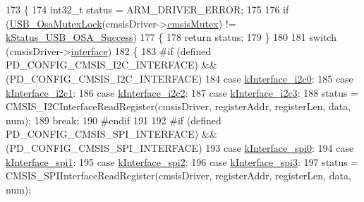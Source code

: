 \begin{DoxyCode}
173 \{
174     int32\_t status = ARM\_DRIVER\_ERROR;
175 
176     \textcolor{keywordflow}{if} (\hyperlink{group__usb__os__abstraction_ga1fed31c4b683c5f652b4e2e8b23c34fd}{USB\_OsaMutexLock}(cmsisDriver->\hyperlink{struct__cmsis__drier__adapter_a952d05d8262ef9aebfa6ca9c4d62fe46}{cmsisMutex}) != 
      \hyperlink{group__usb__os__abstraction_gga453ebd2f93aafb8c938c3a23c815f9bdab90805fb75297fda1ca60dbb2283f933}{kStatus\_USB\_OSA\_Success})
177     \{
178         \textcolor{keywordflow}{return} status;
179     \}
180 
181     \textcolor{keywordflow}{switch} (cmsisDriver->\hyperlink{struct__cmsis__drier__adapter_a51a572fa7a648387cf481b45b862457c}{interface})
182     \{
183 \textcolor{preprocessor}{#if (defined PD\_CONFIG\_CMSIS\_I2C\_INTERFACE) && (PD\_CONFIG\_CMSIS\_I2C\_INTERFACE)
}
184 \textcolor{preprocessor}{}        \textcolor{keywordflow}{case} \hyperlink{group__usb__pd__stack_gga4aed694f998da91dea8d218596d65c1ea0e6fc11f3fbc9732619f2083042e7e17}{kInterface\_i2c0}:
185         \textcolor{keywordflow}{case} \hyperlink{group__usb__pd__stack_gga4aed694f998da91dea8d218596d65c1eaf78fb0f4bdd4db6e8a2e5dab05ba59d2}{kInterface\_i2c1}:
186         \textcolor{keywordflow}{case} \hyperlink{group__usb__pd__stack_gga4aed694f998da91dea8d218596d65c1ea7e08032b6509673dc643a7d01a5baec4}{kInterface\_i2c2}:
187         \textcolor{keywordflow}{case} \hyperlink{group__usb__pd__stack_gga4aed694f998da91dea8d218596d65c1ea369545de00e8d0fb91e9f065d725c16c}{kInterface\_i2c3}:
188             status = CMSIS\_I2CInterfaceReadRegister(cmsisDriver, registerAddr, registerLen, data, num);
189             \textcolor{keywordflow}{break};
190 \textcolor{preprocessor}{#endif
}
191 \textcolor{preprocessor}{}
192 \textcolor{preprocessor}{#if (defined PD\_CONFIG\_CMSIS\_SPI\_INTERFACE) && (PD\_CONFIG\_CMSIS\_SPI\_INTERFACE)
}
193 \textcolor{preprocessor}{}        \textcolor{keywordflow}{case} \hyperlink{group__usb__pd__stack_gga4aed694f998da91dea8d218596d65c1ea48b48a50986d3b6fd9e7640cbea852ef}{kInterface\_spi0}:
194         \textcolor{keywordflow}{case} \hyperlink{group__usb__pd__stack_gga4aed694f998da91dea8d218596d65c1ea178b943373d02f27c53232f7e31e62a6}{kInterface\_spi1}:
195         \textcolor{keywordflow}{case} \hyperlink{group__usb__pd__stack_gga4aed694f998da91dea8d218596d65c1ea1a8206ebb4a5aa81b0401b26d239ad9d}{kInterface\_spi2}:
196         \textcolor{keywordflow}{case} \hyperlink{group__usb__pd__stack_gga4aed694f998da91dea8d218596d65c1ea0842cd2e8c57954daf912b6d7b648e9f}{kInterface\_spi3}:
197             status = CMSIS\_SPIInterfaceReadRegister(cmsisDriver, registerAddr, registerLen, data, num);

\end{DoxyCode}
